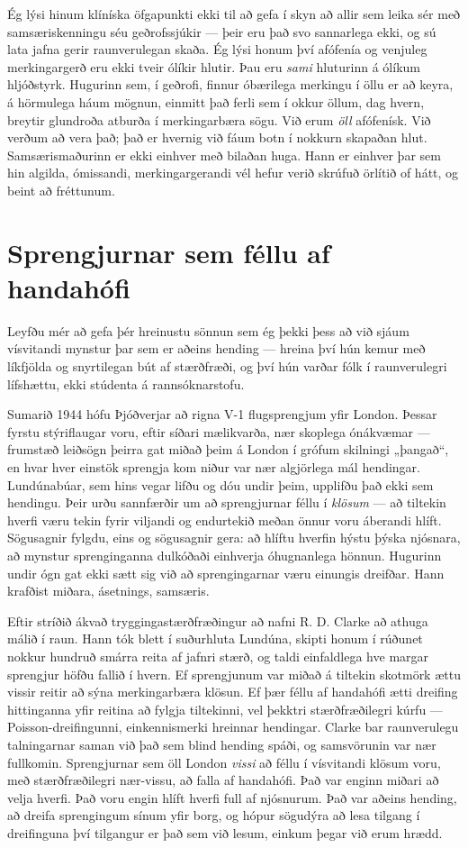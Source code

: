 Ég lýsi hinum klíníska öfgapunkti ekki til að gefa í skyn að allir sem leika sér með samsæriskenningu séu geðrofssjúkir — þeir eru það svo sannarlega ekki, og sú lata jafna gerir raunverulegan skaða. Ég lýsi honum því afófenía og venjuleg merkingargerð eru ekki tveir ólíkir hlutir. Þau eru \emph{sami} hluturinn á ólíkum hljóðstyrk. Hugurinn sem, í geðrofi, finnur óbærilega merkingu í öllu er að keyra, á hörmulega háum mögnun, einmitt það ferli sem í okkur öllum, dag hvern, breytir glundroða atburða í merkingarbæra sögu. Við erum \emph{öll} afófenísk. Við verðum að vera það; það er hvernig við fáum botn í nokkurn skapaðan hlut. Samsærismaðurinn er ekki einhver með bilaðan huga. Hann er einhver þar sem hin algilda, ómissandi, merkingargerandi vél hefur verið skrúfuð örlítið of hátt, og beint að fréttunum.

\section*{Sprengjurnar sem féllu af handahófi}

Leyfðu mér að gefa þér hreinustu sönnun sem ég þekki þess að við sjáum vísvitandi mynstur þar sem er aðeins hending — hreina því hún kemur með líkfjölda og snyrtilegan bút af stærðfræði, og því hún varðar fólk í raunverulegri lífshættu, ekki stúdenta á rannsóknarstofu.

Sumarið 1944 hófu Þjóðverjar að rigna V-1 flugsprengjum yfir London. Þessar fyrstu stýriflaugar voru, eftir síðari mælikvarða, nær skoplega ónákvæmar — frumstæð leiðsögn þeirra gat miðað þeim á London í grófum skilningi „þangað“, en hvar hver einstök sprengja kom niður var nær algjörlega mál hendingar. Lundúnabúar, sem hins vegar lifðu og dóu undir þeim, upplifðu það ekki sem hendingu. Þeir urðu sannfærðir um að sprengjurnar féllu í \emph{klösum} — að tiltekin hverfi væru tekin fyrir viljandi og endurtekið meðan önnur voru áberandi hlíft. Sögusagnir fylgdu, eins og sögusagnir gera: að hlíftu hverfin hýstu þýska njósnara, að mynstur sprenginganna dulkóðaði einhverja óhugnanlega hönnun. Hugurinn undir ógn gat ekki sætt sig við að sprengingarnar væru einungis dreifðar. Hann krafðist miðara, ásetnings, samsæris.

Eftir stríðið ákvað tryggingastærðfræðingur að nafni R. D. Clarke að athuga málið í raun. Hann tók blett í suðurhluta Lundúna, skipti honum í rúðunet nokkur hundruð smárra reita af jafnri stærð, og taldi einfaldlega hve margar sprengjur höfðu fallið í hvern. Ef sprengjunum var miðað á tiltekin skotmörk ættu vissir reitir að sýna merkingarbæra klösun. Ef þær féllu af handahófi ætti dreifing hittinganna yfir reitina að fylgja tiltekinni, vel þekktri stærðfræðilegri kúrfu — Poisson-dreifingunni, einkennismerki hreinnar hendingar. Clarke bar raunverulegu talningarnar saman við það sem blind hending spáði, og samsvörunin var nær fullkomin. Sprengjurnar sem öll London \emph{vissi} að féllu í vísvitandi klösum voru, með stærðfræðilegri nær-vissu, að falla af handahófi. Það var enginn miðari að velja hverfi. Það voru engin hlíft hverfi full af njósnurum. Það var aðeins hending, að dreifa sprengingum sínum yfir borg, og hópur sögudýra að lesa tilgang í dreifinguna því tilgangur er það sem við lesum, einkum þegar við erum hrædd.

